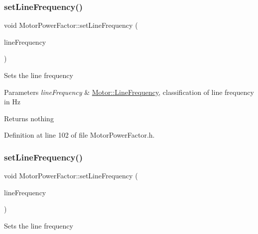 \subsubsection{\texorpdfstring{set\+Line\+Frequency()}{setLineFrequency()}\hspace{0.1cm}{\footnotesize\ttfamily [1/3]}}
{\footnotesize\ttfamily void Motor\+Power\+Factor\+::set\+Line\+Frequency (\begin{DoxyParamCaption}\item[{\hyperlink{class_motor_acee1bdf1b684ad36cb80dc2829d9fcee}{Motor\+::\+Line\+Frequency}}]{line\+Frequency }\end{DoxyParamCaption})\hspace{0.3cm}{\ttfamily [inline]}}

Sets the line frequency


\begin{DoxyParams}{Parameters}
{\em line\+Frequency} & \hyperlink{class_motor_acee1bdf1b684ad36cb80dc2829d9fcee}{Motor\+::\+Line\+Frequency}, classification of line frequency in Hz\\
\hline
\end{DoxyParams}
\begin{DoxyReturn}{Returns}
nothing 
\end{DoxyReturn}


Definition at line 102 of file Motor\+Power\+Factor.\+h.

\mbox{\label{class_motor_power_factor_a5186ccae4191cfc5b2b7c3bdbd166563}} 
\subsubsection{\texorpdfstring{set\+Line\+Frequency()}{setLineFrequency()}\hspace{0.1cm}{\footnotesize\ttfamily [2/3]}}
{\footnotesize\ttfamily void Motor\+Power\+Factor\+::set\+Line\+Frequency (\begin{DoxyParamCaption}\item[{\hyperlink{class_motor_acee1bdf1b684ad36cb80dc2829d9fcee}{Motor\+::\+Line\+Frequency}}]{line\+Frequency }\end{DoxyParamCaption})\hspace{0.3cm}{\ttfamily [inline]}}

Sets the line frequency


